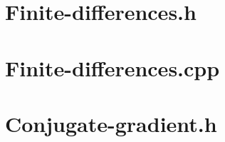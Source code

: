 \documentclass[journal,hidelinks]{IEEEtran}
\begin{document}
\begin{appendices}
\section{Finite-differences.h}
\label{sec:finite-differences-h}

\newpage

\section{Finite-differences.cpp}
\label{sec:finite-differences-cpp}

\newpage

\section{Conjugate-gradient.h}
\label{sec:conjugate-gradient}

\newpage

\end{appendices}
\end{document}
